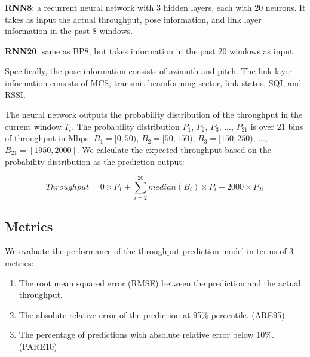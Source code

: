 \documentclass[sigconf,anonymous]{acmart}
\begin{document}
\textbf{RNN8}: a recurrent neural network with 3 hidden layers, each with 20 neurons. It takes as input the actual throughput, pose information, and link layer information in the past 8 windows.

\textbf{RNN20}: same as BP8, but takes information in the past 20 windows as input.

Specifically, the pose information consists of azimuth and pitch. The link layer information consists of MCS, transmit beamforming sector, link status, SQI, and RSSI.


The neural network outputs the probability distribution of the throughput in the current window $T_{t}$. The probability distribution $P_{1}$, $P_{2}$, $P_{3}$, ..., $P_{21}$ is over 21 bins of throughput in Mbps: $B_{1}=[0,50)$, $B_{2}=[50, 150)$, $B_{3}=[150, 250)$, ..., $B_{21}=[1950, 2000]$. We calculate the expected throughput based on the probability distribution as the prediction output:

\begin{equation}
Throughput = 0 \times P_{1} + \sum_{i=2}^{20} median(B_{i}) \times P_{i} + 2000 \times P_{21}
\end{equation}


\subsection{Metrics}
We evaluate the performance of the throughput prediction model in terms of 3 metrics:

\begin{enumerate}
    \item The root mean squared error (RMSE) between the prediction and the actual throughput.
    \item The absolute relative error of the prediction at 95\% percentile. (ARE95)
    \item The percentage of predictions with absolute relative error below 10\%. (PARE10)
\end{enumerate}
\end{document}
